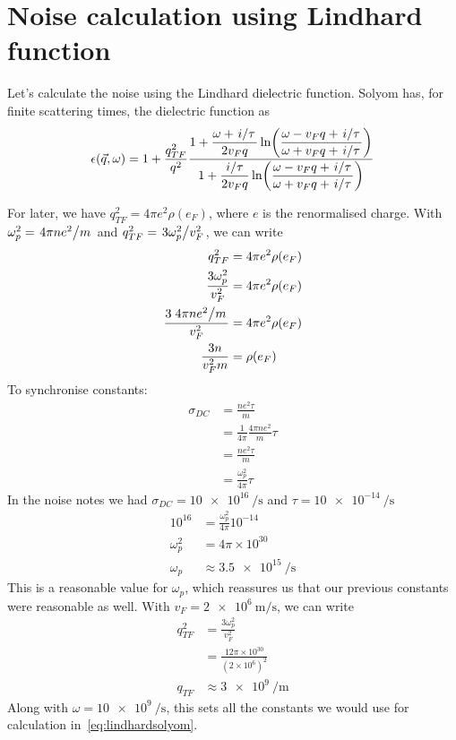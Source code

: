 \documentclass[11pt]{article}
\begin{document}
	\graphicspath{{figures/}}

	\section{Noise calculation using Lindhard function} \label{sec:intro}

	Let's calculate the noise using the Lindhard dielectric function.
	Solyom\supercite{SolyomV3} has, for finite scattering times, the dielectric function as
	\begin{equation}
		\epsilon(\vec{q}, \omega) = 1 + \frac{q_{TF}^2}{q^2}\frac{\displaystyle 1 + \frac{\omega + \flatfrac{i}{\tau}}{2 v_F q} \ln(\frac{\omega - v_F q + \flatfrac{i}{\tau}}{\omega + v_F q + \flatfrac{i}{\tau}})}{\displaystyle 1 + \frac{\flatfrac{i}{\tau}}{2 v_F q} \ln(\frac{\omega - v_F q + \flatfrac{i}{\tau}}{\omega + v_F q + \flatfrac{i}{\tau}})} \label{eq:lindhardsolyom}
	\end{equation}

	For later, we have $q_{TF}^2 = 4 \pi e^2 \rho(e_F)$, where $e$ is the renormalised charge.
	With $\omega_p^2 = \flatfrac{4 \pi n e^2}{m}$ and $q_{TF}^2 = \flatfrac{3 \omega_p^2}{v_F^2}$, we can write
	\begin{align}
		q_{TF}^2 &= 4 \pi e^2 \rho(e_F) \\
		\frac{3 \omega_p^2}{v_F^2} &= 4 \pi e^2 \rho(e_F) \\
		\frac{3 \flatfrac{4 \pi n e^2}{m}}{v_F^2} &= 4 \pi e^2 \rho(e_F) \\
		\frac{3n}{v_F^2 m} &= \rho(e_F) \\
	\end{align}
	To synchronise constants:
	\begin{align}
		\sigma_{DC} &= \frac{n e^2 \tau}{m} \\
		&= \frac{1}{4\pi}\frac{4 \pi n e^2}{m} \tau \\
		&= \frac{n e^2 \tau}{m} \\
		&= \frac{\omega_p^2}{4\pi}\tau
	\end{align}
	In the noise notes we had $\sigma_{DC} = \SI{10e16}{\per\second}$ and $\tau = \SI{10e-14}{\per\second}$
	\begin{align}
		10^{16} &= \frac{\omega_p^2}{4\pi} 10^{-14}\\
		\omega_p^2 &= 4 \pi \times 10^{30} \\
		\omega_p &\approx \SI{3.5e15}{\per\second}
	\end{align}
	This is a reasonable value for $\omega_p$, which reassures us that our previous constants were reasonable as well.
	With $v_F = \SI{2e6}{\m \per \s}$, we can write
	\begin{align}
		q_{TF}^2 &= \frac{3 \omega_p^2}{v_F^2} \\
		&= \frac{12\pi \times 10^{30}}{\left( 2 \times 10^6 \right)^2} \\
		q_{TF} &\approx \SI{3e9}{\per\m}
	\end{align}
	Along with $\omega = \SI{10e9}{\per\second}$, this sets all the constants we would use for calculation in~\eqref{eq:lindhardsolyom}.
\end{document}
